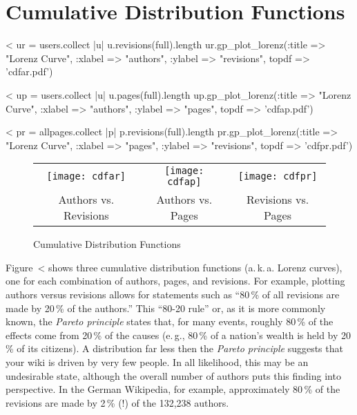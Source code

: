 \documentclass{scrartcl}
\begin{document}



\section{Cumulative Distribution Functions} %
\label{sec:cumulative_distribution_functions}

<%
ur = users.collect { |u| u.revisions(full).length }
ur.gp_plot_lorenz(:title => "Lorenz Curve", :xlabel => "authors", :ylabel => "revisions", topdf => 'cdfar.pdf')

<%
up = users.collect { |u| u.pages(full).length }
up.gp_plot_lorenz(:title => "Lorenz Curve", :xlabel => "authors", :ylabel => "pages", topdf => 'cdfap.pdf')

<%
pr = allpages.collect { |p| p.revisions(full).length }
pr.gp_plot_lorenz(:title => "Lorenz Curve", :xlabel => "pages", :ylabel => "revisions", topdf => 'cdfpr.pdf')

\begin{figure}[htbp]
  \centering
  \begin{tabular}{@{}ccc@{}}
    \texttt{[image: cdfar]} &
    \texttt{[image: cdfap]} &
    \texttt{[image: cdfpr]}\\
    Authors vs. Revisions &
    Authors vs. Pages &
    Revisions vs. Pages
  \end{tabular}
  \caption{Cumulative Distribution Functions}
  \label{fig:cumulative_distribution_functions}
\end{figure}

Figure~<%
shows three cumulative distribution functions (a.\,k.\,a. Lorenz curves), one for each combination of authors, pages, and revisions. For example, plotting authors versus revisions allows for statements such as ``80\,\% of all revisions are made by 20\,\% of the authors.'' This ``80-20 rule'' or, as it is more commonly known, the \emph{Pareto principle} states that, for many events, roughly 80\,\% of the effects come from 20\,\% of the causes (e.\,g., 80\,\% of a nation's wealth is held by 20\,\% of its citizens). A distribution far less then the \emph{Pareto principle} suggests that your wiki is driven by very few people. In all likelihood, this may be an undesirable state, although the overall number of authors puts this finding into perspective. In the German Wikipedia, for example, approximately 80\,\% of the revisions are made by 2\,\% (!) of the 132,238 authors.
\end{document}
